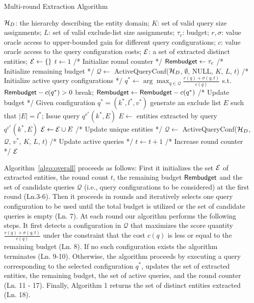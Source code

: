 \begin{algorithm}[h]
\footnotesize\caption{Multi-round Extraction Algorithm}
\label{algo:overall}
\begin{algorithmic}[1]
 $\mathcal{H}_D$: the hierarchy describing the entity domain; $K$: set of valid query size assignments; $L$: set of valid exclude-list size assignments; $\tau_c$: budget; $r,\sigma$: value oracle access to upper-bounded gain for different query configurations; $c$: value oracle access to the query configuration costs;
 $\mathcal{E}$: a set of extracted distinct entities;
\STATE $\mathcal{E} \leftarrow \{\}$
\STATE $t \leftarrow 1$ /* Initialize round counter */
\STATE ${\sf Rembudget} \leftarrow \tau_c$ /* Initialize remaining budget */
\STATE $\mathcal{Q} \leftarrow$ {\sf ActiveQueryConf($\mathcal{H}_D$, $\emptyset$, NULL, $K$, $L$, $t$)} /* Initialize active query configurations */
	\STATE $q^* \leftarrow \arg\max_{q \in {\mathcal{Q}}} \frac{r(q)+\sigma(q,t)}{c(q)}$ s.t. ${\sf Rembudget} - c(q^*) >0$
		\STATE break;
	\ENDIF
	\STATE ${\sf Rembudget} \leftarrow {\sf Rembudget} - c(q^*)$ /* Update budget */
	\STATE Given configuration $q^* = (k^*,l^*,v^*)$ generate an exclude list $E$ such that $|E| = l^*$; 
	\STATE Issue query $q^{v^{*}}(k^*,E)$
	\STATE $E \leftarrow$ entities extracted by query $q^{v^{*}}(k^*,E)$
	\STATE $\mathcal{E} \leftarrow \mathcal{E} \cup E$ /* Update unique entities */
	\STATE $\mathcal{Q} \leftarrow$ {\sf ActiveQueryConf($\mathcal{H}_D$, $\mathcal{Q}$, $v^*$, $K$, $L$, $t$)} /* Update active queries */
	\STATE $t \leftarrow t + 1$ /* Increase round counter */
\ENDWHILE
\RETURN $\mathcal{E}$
\end{algorithmic}
\end{algorithm}

Algorithm~\ref{algo:overall} proceeds as follows: First it initializes the set $\mathcal{E}$ of extracted entities, the round count $t$, the remaining budget ${\sf Rembudget}$ and the set of candidate queries $\mathcal{Q}$ (i.e., query configurations to be considered) at the first round (Ln.3-6). Then it proceeds in rounds and iteratively selects one query configuration to be used until the total budget is utilized or the set of candidate queries is empty (Ln. 7). At each round our algorithm performs the following steps. It first detects a configuration in $\mathcal{Q}$ that maximizes the score quantity $\frac{r(q) + \sigma(q,t)}{c(q)}$ under the constraint that the cost $c(q)$ is less or equal to the remaining budget (Ln. 8). If no such configuration exists the algorithm terminates (Ln. 9-10). Otherwise, the algorithm proceeds by executing a query corresponding to the selected configuration $q^*$, updates the set of extracted entities, the remaining budget, the set of active queries, and the round counter (Ln. 11 - 17). Finally, Algorithm 1 returns the set of distinct entities extracted (Ln. 18). 

